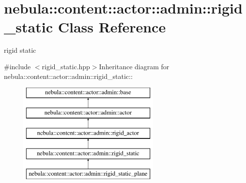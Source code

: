 \hypertarget{classnebula_1_1content_1_1actor_1_1admin_1_1rigid__static}{
\section{nebula::content::actor::admin::rigid\_\-static Class Reference}
\label{classnebula_1_1content_1_1actor_1_1admin_1_1rigid__static}
}


rigid static  


{\ttfamily \#include $<$rigid\_\-static.hpp$>$}Inheritance diagram for nebula::content::actor::admin::rigid\_\-static::\begin{figure}[H]
\begin{center}
\leavevmode
\includegraphics[height=5cm]{classnebula_1_1content_1_1actor_1_1admin_1_1rigid__static}
\end{center}
\end{figure}
